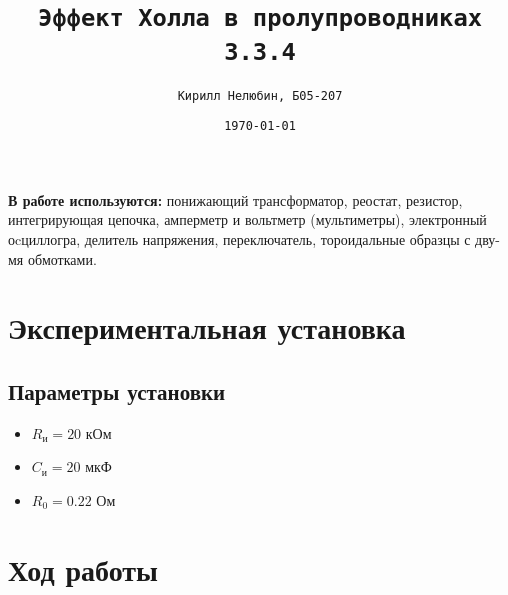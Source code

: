 \documentclass[14pt,a4paper]{article}
\title{\texttt{Эффект Холла в пролупроводниках\\ 3.3.4}}
\author{\texttt{Кирилл Нелюбин, Б05-207}}
\date{\texttt{\today}}
\begin{document}
\maketitle


\textbf{В работе используются:}  
понижающий трансформатор, реостат, резистор, интегрирующая цепочка, амперметр и вольтметр (мультиметры), электронный оcциллогра, делитель напряжения, переключатель, тороидальные образцы с дву-
мя обмотками.


\section*{Экспериментальная установка}


\subsection*{Параметры установки}
\begin{itemize}
  \item $R_\text{и} = 20$ кОм
  \item $C_\text{и} = 20$ мкФ
  \item $R_0 = 0.22$ Ом
\end{itemize}

\newpage
\section*{Ход работы}
\end{document}
